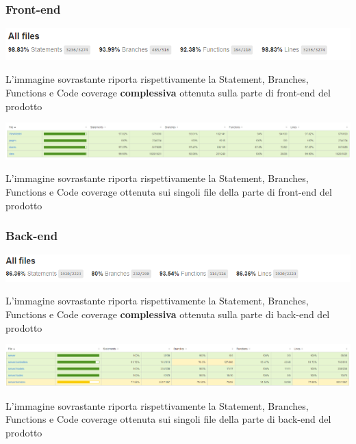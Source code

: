 \documentclass[12pt]{article}
\begin{document}
\subsubsection{Front-end}
\begin{center}
		\begin{center}
			\includegraphics[scale=0.8]{totalCoverageFrontEnd.png}
		\end{center}
		L'immagine sovrastante riporta rispettivamente la Statement, Branches, Functions e Code coverage \textbf{complessiva} ottenuta sulla parte di front-end del prodotto
		\begin{center}
			\includegraphics[scale=0.3]{test_frontEnd.png}	
		\end{center}
		L'immagine sovrastante riporta rispettivamente la Statement, Branches, Functions e Code coverage ottenuta sui singoli file della parte di front-end del prodotto
\end{center}
\subsubsection{Back-end}
	\begin{center}
		\includegraphics[scale=0.8]{totalCoverageBackEnd.png}
	\end{center}
		L'immagine sovrastante riporta rispettivamente la Statement, Branches, Functions e Code coverage \textbf{complessiva} ottenuta sulla parte di back-end del prodotto
	\begin{center}
		\includegraphics[scale=0.3]{test_backEnd.png}
	\end{center}
		L'immagine sovrastante riporta rispettivamente la Statement, Branches, Functions e Code coverage ottenuta sui singoli file della parte di back-end del prodotto
	
\end{document}

